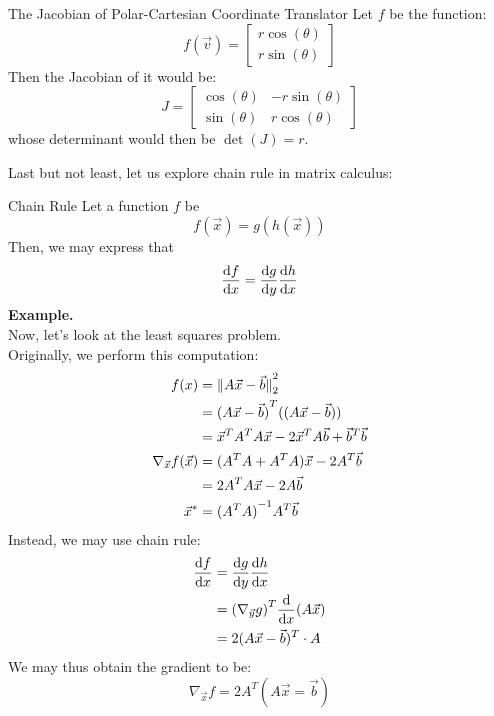 \begin{ln-explain}{The Jacobian of Polar-Cartesian Coordinate Translator}{}
    Let $f$ be the function:
    \[
        f(\vec{v}) = \begin{bmatrix} r \cos(\theta) \\ r \sin(\theta) \end{bmatrix}
    \]
    Then the Jacobian of it would be:
    \[
        J =
        \begin{bmatrix}
            \cos(\theta) & -r \sin(\theta) \\
            \sin(\theta) & r \cos(\theta)
        \end{bmatrix}
    \]
    whose determinant would then be $\det(J) = r$.
\end{ln-explain}

Last but not least, let us explore chain rule in matrix calculus:
\begin{ln-define}{Chain Rule}{}
    Let a function $f$ be
    \[
        f(\vec{x}) = g(h(\vec{x}))
    \]
    Then, we may express that
    \[
        \dv{f}{x} = \dv{g}{y} \dv{h}{x}
    \]
    \tcblower
    \textbf{Example.} \\
    Now, let's look at the least squares problem. \\
    Originally, we perform this computation:
    \begin{align*}
        f(x)
        &= \pnorm[2]{A \vec{x} - \vec{b}}{2} \\
        &= {(A \vec{x} - \vec{b})}^T ((A \vec{x} - \vec{b})) \\
        &= \vec{x}^T A^T A \vec{x} - 2 \vec{x}^T A \vec{b} + \vec{b}^T \vec{b} \\
        \nabla_{\vec{x}} f(\vec{x})
        &= (A^T A + A^T A) \vec{x} - 2 A^T \vec{b} \\
        &= 2 A^T A \vec{x} - 2 A \vec{b} \\
        \vec{x}^* &= {(A^T A)}^{-1} A^T \vec{b}
    \end{align*}
    Instead, we may use chain rule:
    \begin{align*}
        \dv{f}{x}
        &= \dv{g}{y} \dv{h}{x} \\
        &= {(\nabla_{\vec{y}} g)}^T \dv{}{x} {} (A \vec{x}) \\
        &= 2(A \vec{x} - \vec{b})^T \cdot A
    \end{align*}
    We may thus obtain the gradient to be:
    \[
        \nabla_{\vec{x}} f = 2 A^T (A \vec{x} = \vec{b})
    \]
\end{ln-define}

